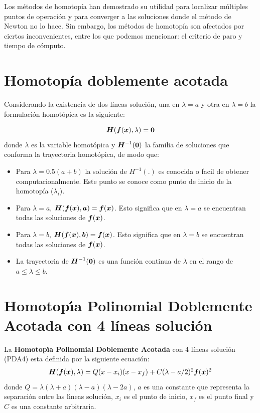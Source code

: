 \documentclass[conference,letterpaper,onecolumn]{IEEEtran}
\newcommand{\pig}[1]{\mbox{\boldmath ${#1}$}	}
\begin{document}
Los m\'etodos de homotop{\'i}a \cite{BHLHOM,homo_ushida1,homo_green2,homo_DWolfMulti,homo_ArtificialP} han demostrado su utilidad para localizar m\'ultiples puntos de operaci\'on y para converger a las soluciones donde el m\'etodo de Newton no lo hace. Sin embargo, los m\'etodos de homotop{\'i}a son afectados por ciertos inconvenientes, entre los que podemos mencionar: el criterio de paro y tiempo de c\'omputo.  


\section{Homotop{\'i}a doblemente acotada}


Considerando la existencia de dos l{\'i}neas soluci\'on, una en
$\lambda=a$ y otra en $\lambda=b$ la formulaci\'on homot\'opica es la siguiente:


\begin{equation}
\pig{H}(\pig{f}(\pig{x}),\lambda ) =\pig{0}
\label{H2M}
\end{equation}
donde $\lambda$ es la variable homot\'opica y $\pig{H}^{-1}(\pig{0})$ la familia
de soluciones que conforma la trayectoria homot\'opica, de modo que:


\begin{itemize}
\item Para $\lambda=0.5(a+b)$ la soluci\'on de $H^{-1}(.)$ es conocida
o facil de obtener computacionalmente. Este punto se conoce como
punto de inicio de la homotop{\'i}a ($\lambda_i$).
\item Para $\lambda=a$, $\pig{H}(\pig{f}(\pig{x}),\pig{a} )=\pig{f}(\pig{x})$.
Esto significa que en $\lambda=a$ se encuentran todas las soluciones de $\pig{f}(\pig{x})$.
\item Para $\lambda=b$, $\pig{H}(\pig{f}(\pig{x}),\pig{b} )=\pig{f}(\pig{x})$.
Esto significa que en $\lambda=b$ se encuentran todas las soluciones de $\pig{f}(\pig{x})$.
\item La trayectoria de $\pig{H}^{-1}(\pig{0})$  es una funci\'on continua de $\lambda$ en el rango de $a \leq \lambda \leq b $. 
\end{itemize}

\section{Homotop\'{\i}a Polinomial Doblemente Acotada con 4 l{\'i}neas soluci\'on}

La {\bf Homotop\'{\i}a Polinomial Doblemente Acotada} con 4 l{\'i}neas soluci\'on (PDA4) esta definida por la siguiente ecuaci\'on:
\begin{equation}
{\small
\begin{array}{l}
\pig{H}(\pig{f}(\pig{x}),\lambda )=Q(x-x_i)(x-x_f) +C(\lambda-a/2)^2 \pig{f}(\pig{x})^2
\end{array}}
\label{homotopiaP}
\end{equation}
donde {\small $Q=\lambda(\lambda+a)(\lambda-a)(\lambda-2a)$}, $a$ es una constante que representa la separaci\'on entre las l\'{\i}neas soluci\'on, $x_i$ es el punto
de inicio, $x_f$ es el punto final y $C$ es una constante arbitraria.
\end{document}
